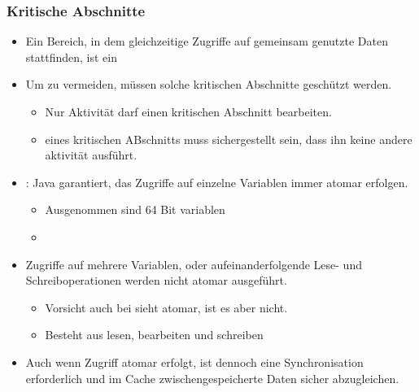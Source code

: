 \subsubsection{Kritische Abschnitte}
\begin{itemize}
    \item Ein Bereich, in dem gleichzeitige Zugriffe auf gemeinsam genutzte Daten stattfinden, ist ein 
    \item Um  zu vermeiden, müssen solche kritischen Abschnitte geschützt werden.
    \begin{itemize}
        \item Nur  Aktivität darf einen kritischen Abschnitt  bearbeiten.
        \item {} eines kritischen ABschnitts muss sichergestellt sein, dass ihn keine andere aktivität ausführt.
    \end{itemize}
    \item {}: Java garantiert, das Zugriffe auf einzelne Variablen immer atomar erfolgen.
    \begin{itemize}
        \item Ausgenommen sind 64 Bit variablen
        \item {} 
    \end{itemize}
    \item Zugriffe auf mehrere Variablen, oder aufeinanderfolgende Lese- und Schreiboperationen werden nicht atomar ausgeführt.
    \begin{itemize}
        \item Vorsicht auch bei  sieht atomar, ist es aber nicht.
        \item Besteht aus lesen, bearbeiten und schreiben
    \end{itemize}
    \item Auch wenn Zugriff atomar erfolgt, ist dennoch eine Synchronisation erforderlich und im Cache zwischengespeicherte Daten sicher abzugleichen.
\end{itemize}


